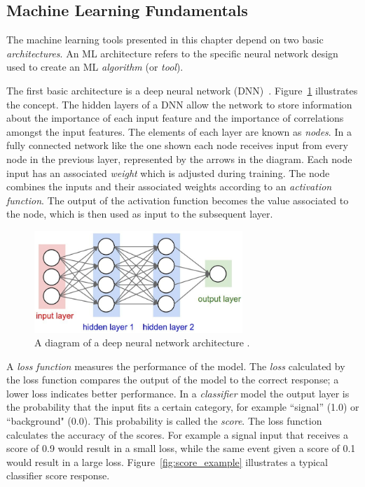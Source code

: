 \subsection{Machine Learning Fundamentals}
\label{sec:ml_fund}

The machine learning tools presented in this chapter depend on two basic \textit{architectures}.
An ML architecture refers to the specific neural network design used to create an ML \textit{algorithm} (or \textit{tool}). 

The first basic architecture is a deep neural network (DNN)~\cite{dnn}.
Figure~\ref{fig:dnn} illustrates the concept.
The hidden layers of a DNN allow the network to store information about the importance of each input feature and the importance of correlations amongst the input features.
The elements of each layer are known as \textit{nodes}.
In a fully connected network like the one shown each node receives input from every node in the previous layer, represented by the arrows in the diagram.
Each node input has an associated \textit{weight} which is adjusted during training.
The node combines the inputs and their associated weights according to an \textit{activation function}.
The output of the activation function becomes the value associated to the node, which is then used as input to the subsequent layer.

\begin{figure}[!htbp]
\centering
   \includegraphics[width=0.7\textwidth]{figures/ml/dnn}
    \caption{A diagram of a deep neural network architecture \cite{dnn_pic}. 
    \label{fig:dnn}}
\end{figure}

A \textit{loss function} measures the performance of the model. 
The \textit{loss} calculated by the loss function compares the output of the model to the correct response; a lower loss indicates better performance.
In a \textit{classifier} model the output layer is the probability that the input fits a certain category, for example ``signal'' (1.0) or ``background" (0.0).
This probability is called the \textit{score}.
The loss function calculates the accuracy of the scores.
For example a signal input that receives a score of 0.9 would result in a small loss, while the same event given a score of 0.1 would result in a large loss.
Figure~\ref{fig:score_example} illustrates a typical classifier score response.

